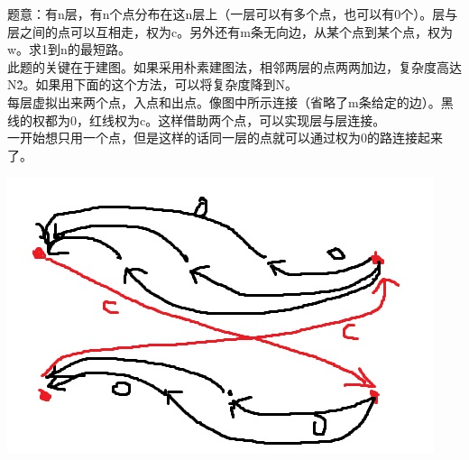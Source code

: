 题意：有n层，有n个点分布在这n层上（一层可以有多个点，也可以有0个）。层与层之间的点可以互相走，权为c。另外还有m条无向边，从某个点到某个点，权为w。求1到n的最短路。 \\
此题的关键在于建图。如果采用朴素建图法，相邻两层的点两两加边，复杂度高达N\^2。如果用下面的这个方法，可以将复杂度降到N。 \\
每层虚拟出来两个点，入点和出点。像图中所示连接（省略了m条给定的边）。黑线的权都为0，红线权为c。这样借助两个点，可以实现层与层连接。 \\
一开始想只用一个点，但是这样的话同一层的点就可以通过权为0的路连接起来了。 \\
\begin{center}
\includegraphics[scale=1]{./模板/13_一些题目/3.jpg}
\end{center}

